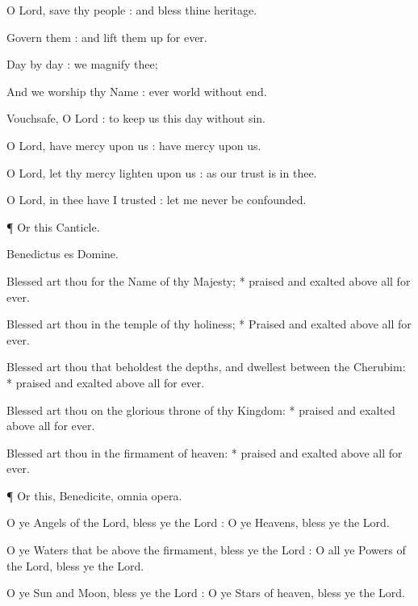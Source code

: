 O Lord, save thy people : and bless thine heritage.

Govern them : and lift them up for ever.

Day by day : we magnify thee;

And we worship thy Name : ever world without end.

Vouchsafe, O Lord : to keep us this day without sin.

O Lord, have mercy upon us : have mercy upon us.

O Lord, let thy mercy lighten upon us : as our trust is in thee.

O Lord, in thee have I trusted : let me never be confounded.

¶ Or this Canticle.

    Benedictus es Domine.
    

Blessed art thou for the Name of thy Majesty; * praised and exalted above all for ever.

Blessed art thou in the temple of thy holiness; * Praised and exalted above all for ever.

Blessed art thou that beholdest the depths, and dwellest between the Cherubim: * praised and exalted above all for ever.

Blessed art thou on the glorious throne of thy Kingdom: * praised and exalted above all for ever.

Blessed art thou in the firmament of heaven: * praised and exalted above all for ever.
    
    ¶ Or this,
    Benedicite, omnia opera.

O ye Angels of the Lord, bless ye the Lord : O ye Heavens, bless ye the Lord.

O ye Waters that be above the firmament, bless ye the Lord : O all ye Powers of the Lord, bless ye the Lord.

O ye Sun and Moon, bless ye the Lord : O ye Stars of heaven, bless ye the Lord.

